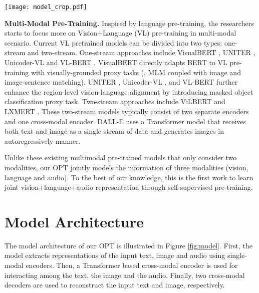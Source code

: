 \documentclass[10pt,twocolumn,letterpaper]{article}
\begin{document}
\begin{figure*}[t]
\begin{center}
\texttt{[image: model\_crop.pdf]}
\end{center}
  \caption{Model architecture of the proposed OPT, consisting of three single-modal encoders, a cross-modal encoder and two cross-modal decoders. We propose three levels of pre-training tasks: (1) token-level modeling, including masked language modeling (MLM), masked vision modeling (MVM), and masked audio modeling (MAM); (2) modality-level modeling, including denoising text reconstruction and denoising image reconstruction; and (3) sample-level modeling, where ``'' denotes the corresponding modalities are matching. We introduce two masking mechanisms: (1) token-level masking, in order for token-level modeling; and (2) modality-level masking, in order for modality-level modeling and enabling arbitrary number of input modalities.}
\label{fig:model}
\end{figure*}

\textbf{Multi-Modal Pre-Training.} Inspired by language pre-training, the researchers starts to focus more on Vision+Language (VL) pre-training in multi-modal scenario. Current VL pretrained models can be divided into two types: one-stream and two-stream. One-stream approaches include VisualBERT \cite{visualbert}, UNITER \cite{chen2019uniter}, Unicoder-VL \cite{unicoder} and VL-BERT \cite{su2019vl}. VisualBERT \cite{visualbert} directly adapts BERT to VL pre-training with visually-grounded proxy tasks (\eg, MLM coupled with image and image-sentence matching). UNITER \cite{chen2019uniter}, Unicoder-VL \cite{unicoder}, and VL-BERT \cite{su2019vl} further enhance the region-level vision-language alignment by introducing masked object classification proxy task. Two-stream approaches include ViLBERT \cite{lvilbert} and LXMERT \cite{tan2019lxmert}. These two-stream models typically consist of two separate encoders and one cross-modal encoder. DALL-E \cite{dalle} uses a Transformer model that receives both text and image as a single stream of data and generates images in autoregressively manner. 

Unlike these existing multimodal pre-trained models that only consider two modalities, our OPT jointly models the information of three modalities (\ie vision, language and audio). To the best of our knowledge, this is the first work to learn joint vision+language+audio representation through self-supervised pre-training. 

\section{Model Architecture}
The model architecture of our OPT is illustrated in Figure \ref{fig:model}. First, the model extracts representations of the input text, image and audio using single-modal encoders. Then, a Transformer based cross-modal encoder is used for interacting among the text, the image and the audio. Finally, two cross-modal decoders are used to reconstruct the input text and image, respectively.  
\end{document}
